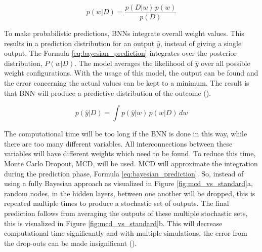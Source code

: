 \begin{equation}
    p(w|D) = \frac{p(D|w) \, p(w)}{p(D)}
    \label{eq:bayes_theorem}
\end{equation}

\noindent To make probabilistic predictions, BNNs integrate overall weight values. This results in a prediction distribution for an output $\hat{y}$, instead of giving a single output. The Formula \ref{eq:bayesian_prediction} integrates over the posterior distribution, $P(w|D)$. The model averages the likelihood of $\hat{y}$ over all possible weight configurations. With the usage of this model, the output can be found and the error concerning the actual values can be kept to a minimum. The result is that BNN will produce a predictive distribution of the outcome (\cite{mackay1992bayesian}).

\begin{equation}
    p(\hat{y}|D) = \int p(\hat{y}|w) \, p(w|D) \, dw
    \label{eq:bayesian_prediction}
\end{equation}

\noindent The computational time will be too long if the BNN is done in this way, while there are too many different variables. All interconnections between these variables will have different weights which need to be found. To reduce this time, Monte Carlo Dropout, MCD, will be used. MCD  will approximate the integration during the prediction phase, Formula \ref{eq:bayesian_prediction}. So, instead of using a fully Bayesian approach as visualized in Figure \ref{fig:mcd_vs_standard}a, random nodes, in the hidden layers, between one another will be dropped, this is repeated multiple times to produce a stochastic set of outputs. The final prediction follows from averaging the outputs of these multiple stochastic sets, this is visualized in Figure \ref{fig:mcd_vs_standard}b. This will decrease computational time significantly and with multiple simulations, the error from the drop-outs can be made insignificant (\cite{mae2022uncertainty,gal2016dropout}).

